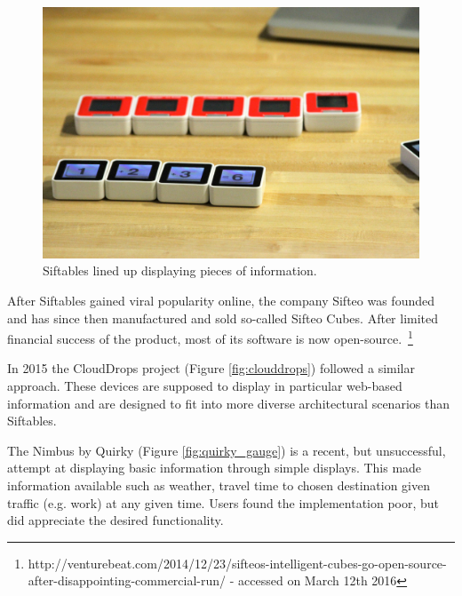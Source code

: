 \begin{figure}[ht]
\centering
	\includegraphics[keepaspectratio, width=6in]{Figures/siftables.jpg}
	\caption{Siftables lined up displaying pieces of information.\protect\footnotemark}
	\label{fig:siftables}
\end{figure}



After Siftables gained viral popularity online, the company Sifteo was founded and has since then manufactured and sold so-called Sifteo Cubes. After limited financial success of the product, most of its software is now open-source.~\footnote{http://venturebeat.com/2014/12/23/sifteos-intelligent-cubes-go-open-source-after-disappointing-commercial-run/ - accessed  on March 12th 2016}

In 2015 the CloudDrops project (Figure \ref{fig:clouddrops}) followed a similar approach. These devices are supposed to display in particular web-based information and are designed to fit into more diverse architectural scenarios than Siftables.~\cite{Olberding:2015:CSP:2757710.2757718}

The Nimbus by Quirky (Figure \ref{fig:quirky_gauge}) is a recent, but unsuccessful, attempt at displaying basic information through simple displays. This made information available such as weather, travel time to chosen destination given traffic (e.g. work) at any given time. Users found the implementation poor, but did appreciate the desired functionality.

